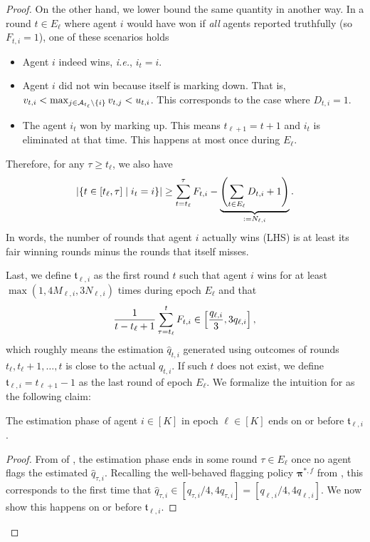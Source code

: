 \begin{proof}
On the other hand, we lower bound the same quantity in another way. In a round $t\in E_\ell$ where agent $i$ would have won if \emph{all} agents reported truthfully (so $F_{t,i}=1$), one of these scenarios holds
\begin{itemize}
    \item Agent $i$ indeed wins, \textit{i.e.}, $i_t=i$.
    \item Agent $i$ did not win because itself is marking down. That is, $v_{t,i}<\max_{j\in \mathcal{A}_{t_\ell}\setminus \{i\}}v_{t,j}<u_{t,i}$. This corresponds to the case where $D_{t,i}=1$.
    \item The agent $i_t$ won by marking up. This means $t_{\ell+1}=t+1$ and $i_t$ is eliminated at that time. This happens at most once during $E_\ell$.
\end{itemize}
Therefore, for any $\tau\ge t_\ell$, we also have
\begin{equation}\label{eq:lower_bound_nb_wins}
    \left|\left\{  t\in[t_\ell,\tau]\mid i_{t}=i  \right\}\right| \geq \sum_{t=t_\ell}^{\tau} F_{t,i} - \underbrace{\left( \sum_{t\in E_\ell}D_{t,i} + 1 \right)}_{:=N_{\ell,i}}.
\end{equation}
In words, the number of rounds that agent $i$ actually wins (LHS) is at least its fair winning rounds minus the rounds that itself misses.

Last, we define ${\mathfrak t}_{\ell,i}$ as the first round $t$ such that agent $i$ wins for at least $\max(1,4M_{\ell,i}, 3N_{\ell,i})$ times during epoch $E_\ell$ and that
\begin{equation}\label{eq:constraint_F}
    \frac{1}{t-t_\ell+1}\sum_{\tau=t_\ell}^t F_{t,i} \in\left[ \frac{q_{\ell,i}}{3}, 3q_{\ell,i} \right],
\end{equation}
which roughly means the estimation $\hat q_{t,i}$ generated using outcomes of rounds $t_\ell,t_\ell+1,\ldots,t$ is close to the actual $q_{t,i}$.
If such $t$ does not exist, we define ${\mathfrak t}_{\ell,i}=t_{\ell+1}-1$ as the last round of epoch $E_\ell$.
We formalize the intuition for  as the following claim:

\begin{claim}
The estimation phase of agent $i\in [K]$ in epoch $\ell\in [K]$ ends on or before $\mathfrak t_{\ell,i}$.
\end{claim}
\begin{proof}
From  of , the estimation phase ends in some round $\tau \in E_\ell$ once no agent flags the estimated $\hat q_{\tau,i}$. Recalling the well-behaved flagging policy ${\bm\pi}^{\ast,f}$ from , this corresponds to the first time that $\hat q_{\tau,i} \in [ q_{\tau,i}/4, 4 q_{\tau,i}]=[q_{\ell,i}/4,4q_{\ell,i}]$. We now show this happens on or before $\mathfrak t_{\ell,i}$.


\end{proof}
\end{proof}
